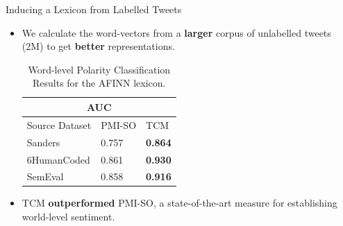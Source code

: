 \documentclass[handout]{beamer}
\begin{document}
\begin{frame}{Inducing a Lexicon from Labelled Tweets}
\begin{scriptsize}
\begin{itemize}
d in a \textbf{corpus of unlabelled tweets} $\mathcal{C}_U$  represented by tweet centroids.
 \item We calculate the word-vectors from a \textbf{larger} corpus of unlabelled tweets (2M) to get \textbf{better} representations.
 \begin{table}[htbp]
\begin{tabular}{l|ll}
\hline \hline
\multicolumn{3}{c}{AUC} \\
\hline \hline
Source Dataset & PMI-SO & TCM  \\ \hline
Sanders & 0.757 &  \textbf{0.864} \\ 
6HumanCoded & 0.861 & \textbf{0.930}  \\ 
SemEval & 0.858 & \textbf{0.916}   \\ \hline
\end{tabular}
\caption{Word-level Polarity Classification Results for the AFINN lexicon.}
\end{table}
  \item TCM \textbf{outperformed} PMI-SO, a state-of-the-art measure for establishing world-level sentiment.
 \end{itemize}
\end{scriptsize}
\end{frame}
\end{document}
